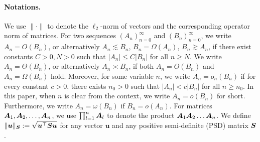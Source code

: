 \paragraph{Notations.}
We use \( \|\cdot\| \) to denote the \( \ell_2 \)-norm of vectors and the corresponding operator norm of matrices. 
For two sequences \((A_n)_{n=0}^\infty\) and \((B_n)_{n=0}^\infty\), we write 
\(A_n = O(B_n)\), or alternatively $A_n \lesssim  B_n$, $B_n = \Omega(A_n)$, $B_n \gtrsim A_n$, if there exist constants \(C>0, N>0\) such that \(|A_n|\leq C|B_n|\) for all \(n \geq N\). %
We write $A_n = \Theta(B_n)$, or alternatively $A_n \asymp  B_n$, if both $A_n = O(B_n)$ and $A_n = \Omega(B_n)$ hold.
Moreover, for some variable $n$, we write $A_n = o_n(B_n)$ if for every constant \(c>0\), there exists \(n_0>0\) such that \(|A_n| < c|B_n|\) for all \(n \geq n_0\). In this paper, when $n$ is clear from the context, we write $A_n = o(B_n)$ for short. Furthermore, we write $A_n = \omega(B_n)$ if $B_n = o(A_n)$. For matrices ${\bm{A}}_1, {\bm{A}}_2,\dots,{\bm{A}}_n$, we use $\prod_{l=1}^n {\bm{A}}_l$ to denote the product ${\bm{A}}_1{\bm{A}}_2\dots{\bm{A}}_n$. We define $\|\boldsymbol{u}\|_{{\bm{S}}} := \sqrt{\boldsymbol{u}^\top {\bm{S}}\boldsymbol{u}}$ for any vector $\boldsymbol{u}$ and any positive semi-definite (PSD) matrix ${\bm{S}}$.


